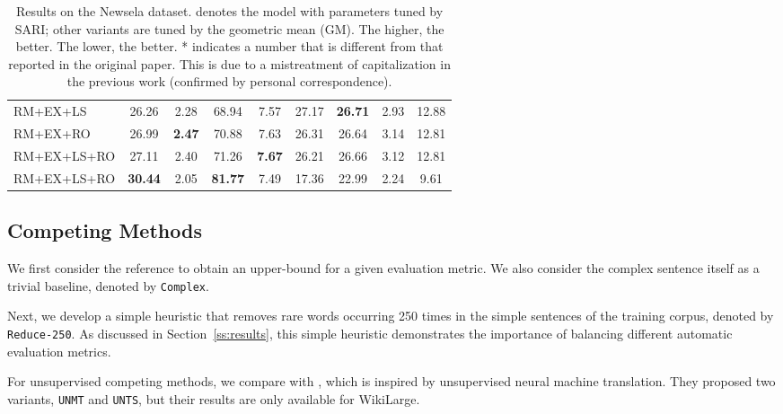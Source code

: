 \documentclass[11pt,a4paper]{article}
\begin{document}
\begin{table*}[t!]
\begin{center}
{\begin{tabular}{|l|c|c|c|c|c|c|c|c|}
RM+EX+LS & 26.26 & 2.28 & 68.94 & 7.57 & 27.17 & \textbf{26.71} & 2.93 & 12.88 \\
RM+EX+RO & 26.99 & \textbf{2.47} & 70.88 & 7.63 & 26.31 & 26.64 & 3.14 & 12.81 \\
RM+EX+LS+RO & 27.11 & 2.40 & 71.26 & \textbf{7.67} & 26.21 & 26.66 & 3.12 & 12.81 \\
RM+EX+LS+RO & \textbf{30.44} & 2.05 & \textbf{81.77} & 7.49 & 17.36 & 22.99 & 2.24 & 9.61 \\
\hline
\end{tabular}
}
\end{center}\vspace{-.3cm}
\caption{\label{results-Newsela} Results on the Newsela dataset.  denotes the model with parameters tuned by SARI; other variants are tuned by the geometric mean (GM). The higher, the better. The lower, the better. * indicates a number that is different from that reported in the original paper. This is due to a mistreatment of capitalization in the previous work (confirmed by personal correspondence).}\vspace{-.2cm}
\end{table*}


\subsection{Competing Methods}

We first consider the reference to obtain an upper-bound for a given evaluation metric. 
We also consider the complex sentence itself as a trivial baseline, denoted by \texttt{Complex}.  

Next, we develop a simple heuristic that removes rare words occurring  250 times in the simple sentences of the training corpus, denoted by \texttt{Reduce-250}. As discussed in Section~\ref{ss:results}, this simple heuristic demonstrates the importance of balancing different automatic evaluation metrics. 

For unsupervised competing methods, we compare with , which is inspired by unsupervised neural machine translation. They proposed two variants, \texttt{UNMT} and \texttt{UNTS}, but their results are only available for WikiLarge.
\end{document}
